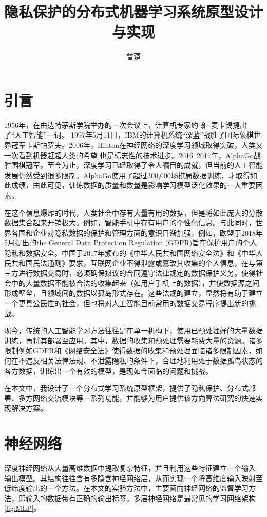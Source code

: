 \documentclass[zihao = -4,cn]{oucart}
\title{隐私保护的分布式机器学习系统原型设计与实现}
\author{曾趸}
\begin{document}
\makecover

\makesignature

\makeabstract

\thispagestyle{tableofcontents}  
\tableofcontents

\newpage
{}
\setcounter{page}{1} 
\section{引言}
1956年，在由达特茅斯学院举办的一次会议上，计算机专家约翰·麦卡锡提出了“人工智能”一词。 1997年5月11日，IBM的计算机系统“深蓝”战胜了国际象棋世界冠军卡斯帕罗夫。2006年，Hinton在神经网络的深度学习领域取得突破\cite{hinton2006fast}，人类又一次看到机器赶超人类的希望,也是标志性的技术进步。2016~2017年，AlphaGo战胜围棋冠军。至今为止，深度学习已经取得了令人瞩目的成就，但当前的人工智能发展仍然受到很多限制。AlphaGo使用了超过300,000场棋局数据训练，才取得如此成绩，由此可见，训练数据的质量和数量是影响学习模型泛化效果的一大重要因素。\par
在这个信息爆炸的时代，人类社会中存有大量有用的数据，但是将如此庞大的分散数据集合起来开销极大。例如，智能手机中存有用户的个性化信息。与此同时，世界各国和企业对隐私数据的保护和管理方面的意识日渐加强，例如，欧盟于2018年5月提出的the General Data Protection Regulation (GDPR)\cite{voigt2017eu}旨在保护用户的个人隐私和数据安全。中国于2017年颁布的《中华人民共和国网络安全法》和《中华人民共和国民法通则》要求，互联网企业不得泄露或篡改其收集的个人信息，在与第三方进行数据交易时，必须确保拟议的合同遵守法律规定的数据保护义务。使得社会中的大量数据不能被合法的收集起来（如用户手机上的数据），并使数据源之间形成壁垒，且领域间的数据以孤岛形式存在。这些法规的建立，显然将有助于建立一个更具公民性的社会，但也将对人工智能目前常用的数据交易程序提出新的挑战。\par
现今，传统的人工智能学习方法往往是在单一机构下，使用已预处理好的大量数据训练，再将其部署至应用。其中，数据的收集和预处理需要耗费大量的资源。诸多限制例如GDPR和《网络安全法》使得数据的收集和预处理面临诸多限制因素，如何在不违反相关法律法规、不泄露隐私的条件下，合理地利用处于数据孤岛状态的各方数据，训练出一个有效的模型，是现如今面临的问题和挑战。\par
在本文中，我设计了一个分布式学习系统原型框架，提供了隐私保护、分布式部署、多方网络交流模块等一系列功能，并能够为用户提供该方向算法研究的快速实现解决方案。\par

\section{神经网络}
深度神经网络从大量高维数据中提取复杂特征，并且利用这些特征建立一个输入-输出模型。其结构往往含有多隐含神经网络层，从而实现一个将高维度输入映射至低纬度输出的一个方法。在本文的实验方法中，主要面向神经网络的监督学习方法，即输入的数据带有正确的输出标签。多层神经网络是最常见的学习网络架构\ref{fig:MLP}。\par
\end{document}
